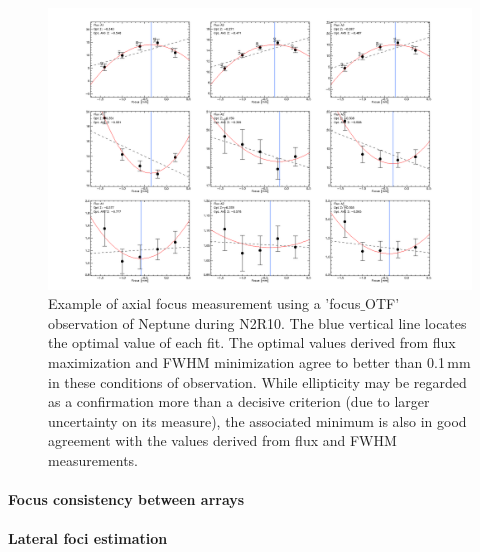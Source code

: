 \begin{figure}
\begin{center}
  \includegraphics[clip, angle=0, scale=0.25]{Figures/plot_20170419s143.png}
\caption[Axial focus measure]{Example of axial focus measurement using a
  'focus$\_$OTF' observation of Neptune during N2R10. The blue vertical line
  locates the optimal value of each fit. The optimal values derived from flux
  maximization and FWHM minimization agree to better than 0.1\,mm in these
  conditions of observation. While ellipticity may be regarded as a confirmation
  more than a decisive criterion (due to larger uncertainty on its measure), the
  associated minimum is also in good agreement with the values derived from flux
  and FWHM measurements.}
\label{fig:focus-example}
\end{center}
\end{figure}

\paragraph{Focus consistency between arrays}


\paragraph{Lateral foci estimation}
\label{sec:focus_X_Y}

